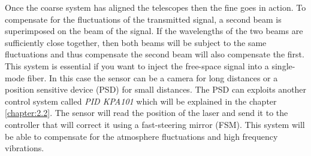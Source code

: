 Once the coarse system has aligned the telescopes then the fine goes in action. To compensate for the fluctuations of the transmitted signal, a second beam is superimposed on the beam of the signal. If the wavelengths of the two beams are sufficiently close together, then both beams will be subject to the same fluctuations and thus compensate the second beam will also compensate the first.
This system is essential if you want to inject the free-space signal into a single-mode fiber. In this case the sensor can be a camera for long distances or a position sensitive device (PSD) for small distances.
The PSD can exploits another control system called \textit{PID KPA101} which will be explained in the chapter \ref{chapter:2.2}. The sensor will read the position of the laser and send it to the controller that will correct it using a fast-steering mirror (FSM). This system will be able to compensate for the atmosphere fluctuations and high frequency vibrations.

